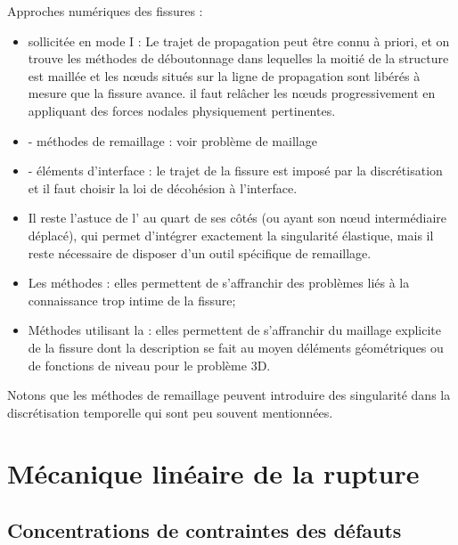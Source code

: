 \medskip
Approches numériques des fissures :
\begin{itemize}
   \item {} sollicitée en mode I :
	Le trajet de propagation peut être connu à priori, et on trouve les
	méthodes de déboutonnage dans lequelles la moitié de la structure est
	maillée et les nœuds situés sur la ligne de propagation sont libérés
	à mesure que la fissure avance.  il faut relâcher les nœuds
	progressivement en appliquant des forces nodales physiquement
	pertinentes.
   \item {} - méthodes de remaillage :
	voir problème de maillage
   \item {} - éléments d'interface :
	le trajet de la fissure est imposé par la discrétisation et il faut choisir
	la loi de décohésion à l'interface.
   \item Il reste l'astuce de l' 
	au quart de ses côtés (ou ayant son nœud intermédiaire déplacé), qui
	permet d'intégrer exactement la singularité élastique, mais il reste
	nécessaire de disposer d'un outil spécifique de remaillage.
   \item Les méthodes : elles permettent de s'affranchir
	des problèmes liés à la connaissance trop intime de la fissure;
   \item Méthodes utilisant la :
	elles permettent de s'affranchir du maillage explicite de la fissure dont la
	description se fait au moyen déléments géométriques ou de fonctions
	de niveau pour le problème 3D.
\end{itemize}
Notons que les méthodes de remaillage peuvent introduire des singularité dans la
discrétisation temporelle qui sont peu souvent mentionnées.













\medskip
\section{Mécanique linéaire de la rupture}

\medskip
\subsection{Concentrations de contraintes des défauts}

